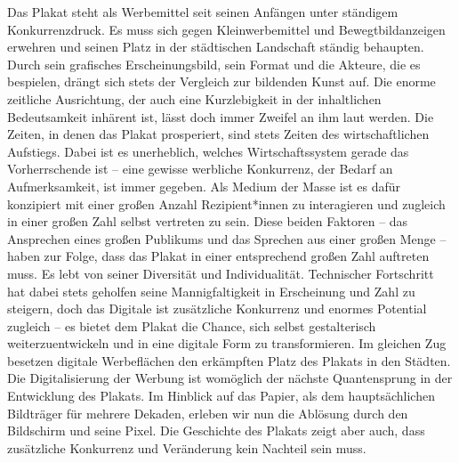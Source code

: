\documentclass[a4paper,12pt,ngerman]{article}
\begin{document}
Das Plakat steht als Werbemittel seit seinen Anfängen unter ständigem Konkurrenzdruck. Es muss sich gegen Kleinwerbemittel und Bewegtbildanzeigen erwehren und seinen Platz in der städtischen Landschaft ständig behaupten. Durch sein grafisches Erscheinungsbild, sein Format und die Akteure, die es bespielen, drängt sich stets der Vergleich zur bildenden Kunst auf. Die enorme zeitliche Ausrichtung, der auch eine Kurzlebigkeit in der inhaltlichen Bedeutsamkeit inhärent ist, lässt doch immer Zweifel an ihm laut werden. Die Zeiten, in denen das Plakat prosperiert, sind stets Zeiten des wirtschaftlichen Aufstiegs. Dabei ist es unerheblich, welches Wirtschaftssystem gerade das Vorherrschende ist -- eine gewisse werbliche Konkurrenz, der Bedarf an Aufmerksamkeit, ist immer gegeben. Als Medium der Masse ist es dafür konzipiert mit einer großen Anzahl Rezipient*innen zu interagieren und zugleich in einer großen Zahl selbst vertreten zu sein. Diese beiden Faktoren -- das Ansprechen eines großen Publikums und das Sprechen aus einer großen Menge -- haben zur Folge, dass das Plakat in einer entsprechend großen Zahl auftreten muss. Es lebt von seiner Diversität und Individualität. Technischer Fortschritt hat dabei stets geholfen seine Mannigfaltigkeit in Erscheinung und Zahl zu steigern, doch das Digitale ist zusätzliche Konkurrenz und enormes Potential zugleich -- es bietet dem Plakat die Chance, sich selbst gestalterisch weiterzuentwickeln und in eine digitale Form zu transformieren. Im gleichen Zug besetzen digitale Werbeflächen den erkämpften Platz des Plakats in den Städten. Die Digitalisierung der Werbung ist womöglich der nächste Quantensprung in der Entwicklung des Plakats. Im Hinblick auf das Papier, als dem hauptsächlichen Bildträger für mehrere Dekaden, erleben wir nun die Ablösung durch den Bildschirm und seine Pixel. Die Geschichte des Plakats zeigt aber auch, dass zusätzliche Konkurrenz und Veränderung kein Nachteil sein muss.

\newpage
\end{document}
